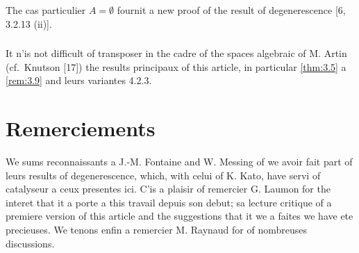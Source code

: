 \documentclass[12pt,a4paper]{article}
\theoremstyle{plain}
\theoremstyle{definition}
\theoremstyle{remark}
\begin{document}
The cas particulier $A = \emptyset$ fournit a new proof of the result of degenerescence [6, 3.2.13 (ii)].

\subsubsection{}

It n'is not difficult of transposer in the cadre of the spaces algebraic of M. Artin (cf.~Knutson [17]) the results principaux of this article, in particular \ref{thm:3.5} a \ref{rem:3.9} and leurs variantes 4.2.3.

\section*{Remerciements}

We sums reconnaissants a J.-M. Fontaine and W. Messing of we avoir fait part of leurs results of degenerescence, which, with celui of K. Kato, have servi of catalyseur a ceux presentes ici. C'is a plaisir of remercier G. Laumon for the interet that it a porte a this travail depuis son debut; sa lecture critique of a premiere version of this article and the suggestions that it we a faites we have ete precieuses. We tenons enfin a remercier M. Raynaud for of nombreuses discussions.
\end{document}
